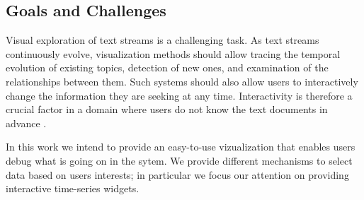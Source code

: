 \documentclass{article}
\begin{document}
\subsection{Goals and Challenges}

Visual exploration of text streams is a challenging task. As text streams continuously evolve, visualization methods should allow tracing the temporal evolution of existing topics, detection of new ones, and examination of the relationships between them.
Such systems should also allow users to interactively change the information they are seeking at any time. 
Interactivity is therefore a crucial factor in a domain where users do not know the text documents in advance \cite{AlsakranCLZYDL12}.

In this work we intend to provide an easy-to-use vizualization that enables users debug what is going on in the sytem. We provide different mechanisms to select data based on users interests; in particular we focus our attention on providing interactive time-series widgets.
\end{document}
